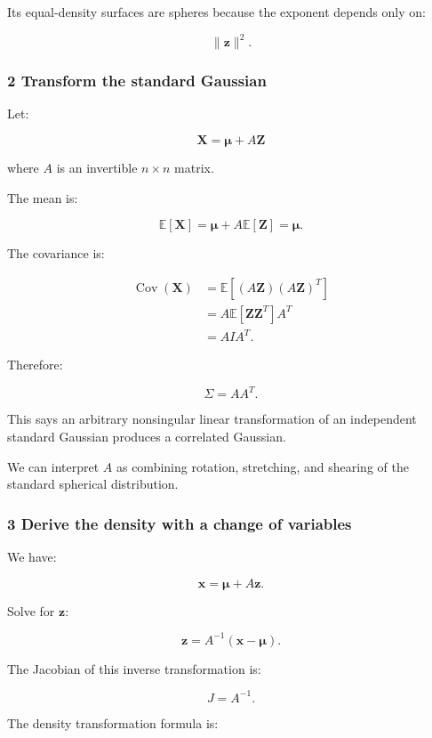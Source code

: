 Its equal-density surfaces are spheres because the exponent depends only on:

\[
 \|\mathbf z\|^2.
\]

\subsubsection{2 Transform the standard Gaussian}\label{02-foundations-ii-ch024-transform-the-standard-gaussian}

Let:

\[
 \boxed{ \mathbf X=\boldsymbol\mu+A\mathbf Z }
\]

where \(A\) is an invertible \(n\times n\) matrix.

The mean is:

\[
 \mathbb E[\mathbf X] = \boldsymbol\mu+A\mathbb E[\mathbf Z] =\boldsymbol\mu.
\]

The covariance is:

\[
 \begin{aligned} \operatorname{Cov}(\mathbf X) &= \mathbb E[ (A\mathbf Z)(A\mathbf Z)^T ]\\ &= A\mathbb E[\mathbf Z\mathbf Z^T]A^T\\ &=AIA^T. \end{aligned}
\]

Therefore:

\[
 \boxed{\Sigma=AA^T}.
\]

This says an arbitrary nonsingular linear transformation of an independent standard Gaussian produces a correlated Gaussian.

We can interpret \(A\) as combining rotation, stretching, and shearing of the standard spherical distribution.

\subsubsection{3 Derive the density with a change of variables}\label{02-foundations-ii-ch024-derive-the-density-with-a-change-of-variables}

We have:

\[
 \mathbf x=\boldsymbol\mu+A\mathbf z.
\]

Solve for \(\mathbf z\):

\[
 \mathbf z=A^{-1}(\mathbf x-\boldsymbol\mu).
\]

The Jacobian of this inverse transformation is:

\[
 J=A^{-1}.
\]

The density transformation formula is:

